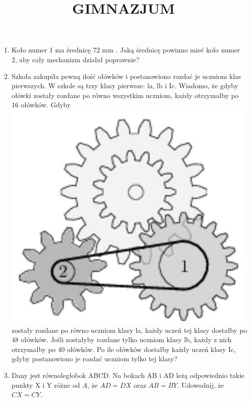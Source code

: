 \documentclass[10pt]{article}
\title{GIMNAZJUM }
\author{}
\date{}
\begin{document}
\maketitle
\begin{enumerate}
  \item Koło numer 1 ma średnicę 72 mm . Jaką średnicę powinno mieć koło numer 2, aby cały mechanizm działał poprawnie?
  \item Szkoła zakupiła pewną ilość ołówków i postanowiono rozdać je uczniom klas pierwszych. W szkole są trzy klasy pierwsze: la, lb i Ic. Wiadomo, że gdyby ołówki zostały rozdane po równo wszystkim uczniom, każdy otrzymałby po 16 ołówków. Gdyby\\
\includegraphics[max width=\textwidth, center]{2024_11_21_380bde68f8bdcfb12cb9g-1}\\
zostały rozdane po równo uczniom klasy la, każdy uczeń tej klasy dostałby po 48 ołówków. Jeśli zostałyby rozdane tylko uczniom klasy lb, każdy z nich otrzymałby po 40 ołówków. Po ile ołówków dostałby każdy uczeń klasy Ic, gdyby postanowiono je rozdać uczniom tylko tej klasy?
  \item Dany jest równoległobok ABCD. Na bokach AB i AD leżą odpowiednio takie punkty X i Y różne od \(A\), że \(A D=D X\) oraz \(A B=B Y\). Udowodnij, że \(C X=C Y\).
\end{enumerate}
\end{document}

